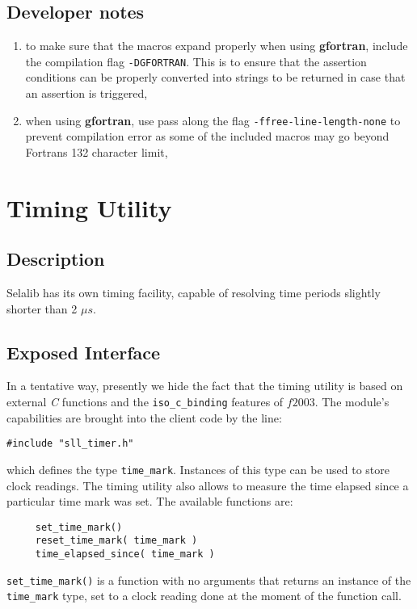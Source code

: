 \documentclass[]{report}   %
\begin{document}
\subsection{Developer notes}
\begin{enumerate}
\item to make sure that the macros expand properly when using \textbf{gfortran}, include the compilation flag \verb+-DGFORTRAN+. This is to ensure that the assertion conditions can be properly converted into strings to be returned in case that an assertion is triggered,
\item when using \textbf{gfortran}, use pass along the flag \verb+-ffree-line-length-none+ to prevent compilation error as some of the included macros may go beyond Fortrans 132 character limit,
\end{enumerate}



\section{Timing Utility}
\subsection{Description}
Selalib has its own timing facility, capable of resolving time periods slightly shorter than 2 $\mu s$. 

\subsection{Exposed Interface}

In a tentative way, presently we hide the fact that the timing utility is based on external \emph{C} functions and the \verb+iso_c_binding+ features of $f2003$. The module's capabilities are brought into the client code by the line:
\begin{verbatim}
#include "sll_timer.h"
\end{verbatim}
which defines the type \verb+time_mark+. Instances of this type can be used to store clock readings. The timing utility also allows to measure the time elapsed since a particular time mark was set. The available functions are:

\begin{verbatim}
     set_time_mark()
     reset_time_mark( time_mark )
     time_elapsed_since( time_mark )
\end{verbatim}

\verb+set_time_mark()+ is a function with no arguments that returns an instance of the \verb+time_mark+ type, set to a clock reading done at the moment of the function call.
\end{document}
